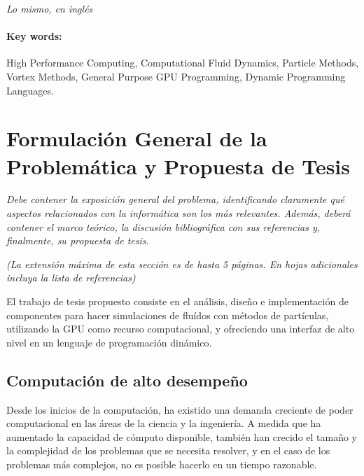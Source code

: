 \documentclass[11pt,spanish]{article}
\begin{document}
\emph{Lo mismo, en inglés}

\paragraph{Key words:}
High Performance Computing,
Computational Fluid Dynamics,
Particle Methods,
Vortex Methods,
General Purpose GPU Programming,
Dynamic Programming Languages.

\newpage
\section{Formulación General de la Problemática y Propuesta de Tesis}

\emph{Debe contener la exposición general del problema, identificando claramente qué
aspectos relacionados con la informática son los más relevantes.  Además,
deberá contener el marco teórico, la discusión bibliográfica con sus
referencias y, finalmente, su propuesta de tesis.}
    
\emph{(La extensión máxima de esta sección es de hasta 5 páginas.  En hojas
adicionales incluya la lista de referencias)}

El trabajo de tesis propuesto consiste en el análisis, diseño e implementación
de componentes para hacer simulaciones de fluídos con métodos de partículas,
utilizando la GPU como recurso computacional, y ofreciendo una interfaz de alto
nivel en un lenguaje de programación dinámico.

\subsection{Computación de alto desempeño}

Desde los inicios de la computación, ha existido una demanda creciente de poder
computacional en las áreas de la ciencia y la ingeniería.  A medida que ha
aumentado la capacidad de cómputo disponible, también han crecido el tamaño y la
complejidad de los problemas que se necesita resolver, y en el caso de los
problemas más complejos, no es posible hacerlo en un tiempo razonable.
\cite{parallel-programming}
\end{document}
